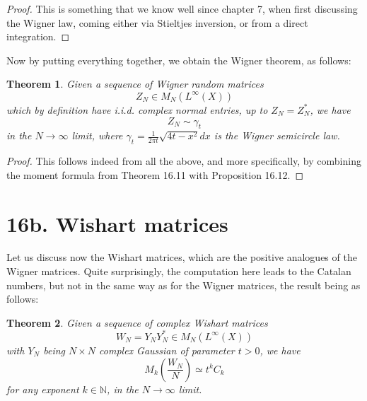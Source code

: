 \documentclass[12pt]{amsbook}
\newtheorem{theorem}{Theorem}[chapter]
\begin{document}
\begin{proof}
This is something that we know well since chapter 7, when first discussing the Wigner law, coming either via Stieltjes inversion, or from a direct integration.
\end{proof}

Now by putting everything together, we obtain the Wigner theorem, as follows:

\begin{theorem}
Given a sequence of Wigner random matrices
$$Z_N\in M_N(L^\infty(X))$$
which by definition have i.i.d. complex normal entries, up to $Z_N=Z_N^*$, we have
$$Z_N\sim\gamma_t$$
in the $N\to\infty$ limit, where $\gamma_t=\frac{1}{2\pi t}\sqrt{4t-x^2}dx$ is the Wigner semicircle law. 
\end{theorem}

\begin{proof}
This follows indeed from all the above, and more specifically, by combining the moment formula from Theorem 16.11 with Proposition 16.12.
\end{proof}

\section*{16b. Wishart matrices}

Let us discuss now the Wishart matrices, which are the positive analogues of the Wigner matrices. Quite surprisingly, the computation here leads to the Catalan numbers, but not in the same way as for the Wigner matrices, the result being as follows:

\begin{theorem}
Given a sequence of complex Wishart matrices
$$W_N=Y_NY_N^*\in M_N(L^\infty(X))$$
with $Y_N$ being $N\times N$ complex Gaussian of parameter $t>0$, we have
$$M_k\left(\frac{W_N}{N}\right)\simeq t^kC_k$$
for any exponent $k\in\mathbb N$, in the $N\to\infty$ limit.
\end{theorem}
\end{document}
